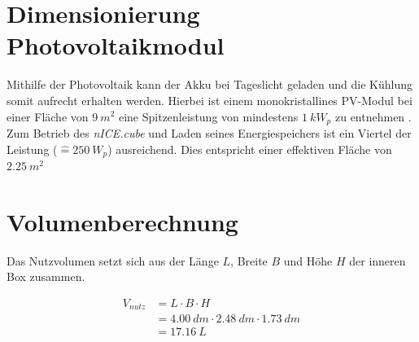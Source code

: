 	
	\section{Dimensionierung Photovoltaikmodul}
	Mithilfe der Photovoltaik kann der Akku bei Tageslicht geladen und die Kühlung somit aufrecht erhalten werden. Hierbei ist einem monokristallines PV-Modul bei einer Fläche
	von $ \SI{9}{m^2} $ eine Spitzenleistung von mindestens $ \SI{1}{kW_p} $ zu entnehmen \cite{Wesselak.photovoltaik.2012}. Zum Betrieb des \textit{nICE.cube} und Laden seines Energiespeichers ist ein
	Viertel der Leistung ($ \widehat{=} \SI{250}{W_p} $) ausreichend. Dies entspricht einer effektiven Fläche von $ \SI{2,25}{m^2} $
		
	\section{Volumenberechnung}
		Das Nutzvolumen setzt sich aus der Länge $ L $, Breite $ B $ und Höhe $ H $ der inneren Box zusammen.
		
		\begin{align}
		V_{nutz} &= L \cdot B \cdot H \nonumber \\
		&= \SI{4,00}{dm} \cdot \SI{2,48}{dm} \cdot \SI{1,73}{dm} \nonumber \\
		&= \SI{17,16}{L}
		\end{align}
		
